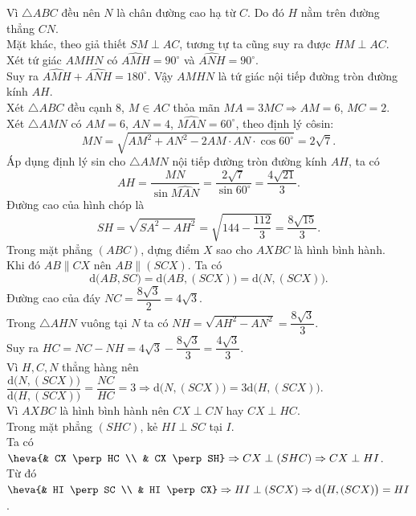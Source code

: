 \begin{ex}
{		Vì $\triangle ABC$ đều nên $N$ là chân đường cao hạ từ $C$. Do đó $H$ nằm trên đường thẳng $CN$.\\
		Mặt khác, theo giả thiết $SM \perp AC$, tương tự ta cũng suy ra được $HM \perp AC$.\\
		Xét tứ giác $AMHN$ có $\widehat{AMH} = 90^\circ$ và $\widehat{ANH} = 90^\circ$.\\
		Suy ra $\widehat{AMH} + \widehat{ANH} = 180^\circ$. Vậy $AMHN$ là tứ giác nội tiếp đường tròn đường kính $AH$.\\
		Xét $\triangle ABC$ đều cạnh $8$, $M \in AC$ thỏa mãn $MA = 3MC \Rightarrow AM = 6$, $MC = 2$.\\
		Xét $\triangle AMN$ có $AM = 6$, $AN = 4$, $\widehat{MAN} = 60^\circ$, theo định lý côsin:
		\[ MN = \sqrt{AM^2 + AN^2 - 2AM \cdot AN \cdot \cos 60^\circ} = 2\sqrt{7}. \]
		Áp dụng định lý sin cho $\triangle AMN$ nội tiếp đường tròn đường kính $AH$, ta có
		\[ AH = \dfrac{MN}{\sin \widehat{MAN}} = \dfrac{2\sqrt{7}}{\sin 60^\circ} = \dfrac{4\sqrt{21}}{3}. \]
		Đường cao của hình chóp là 
		\[ SH = \sqrt{SA^2 - AH^2} = \sqrt{144 - \dfrac{112}{3}} = \dfrac{8\sqrt{15}}{3}. \]
		Trong mặt phẳng $(ABC)$, dựng điểm $X$ sao cho $AXBC$ là hình bình hành.\\
		Khi đó $AB \parallel CX$ nên $AB \parallel (SCX)$. Ta có
		\[ \mathrm{d}\big(AB, SC\big) = \mathrm{d}\big(AB, (SCX)\big) = \mathrm{d}\big(N, (SCX)\big). \]
		Đường cao của đáy $NC = \dfrac{8\sqrt{3}}{2} = 4\sqrt{3}$.\\
		Trong $\triangle AHN$ vuông tại $N$ ta có $NH = \sqrt{AH^2 - AN^2} = \dfrac{8\sqrt{3}}{3}$.\\
		Suy ra $HC = NC - NH = 4\sqrt{3} - \dfrac{8\sqrt{3}}{3} = \dfrac{4\sqrt{3}}{3}$.\\
		Vì $H, C, N$ thẳng hàng nên $\dfrac{\mathrm{d}\big(N, (SCX)\big)}{\mathrm{d}\big(H, (SCX)\big)} = \dfrac{NC}{HC} = 3 \Rightarrow \mathrm{d}\big(N, (SCX)\big) = 3\mathrm{d}\big(H, (SCX)\big)$.\\
		Vì $AXBC$ là hình bình hành nên $CX \perp CN$ hay $CX \perp HC$. \\
		Trong mặt phẳng $(SHC)$, kẻ $HI \perp SC$ tại $I$.\\
		Ta có $\heva{& CX \perp HC \\ & CX \perp SH} \Rightarrow CX \perp (SHC) \Rightarrow CX \perp HI$.\\
		Từ đó $\heva{& HI \perp SC \\ & HI \perp CX} \Rightarrow HI \perp (SCX) \Rightarrow \mathrm{d}\big(H, (SCX)\big) = HI$.\\
}
\end{ex}
